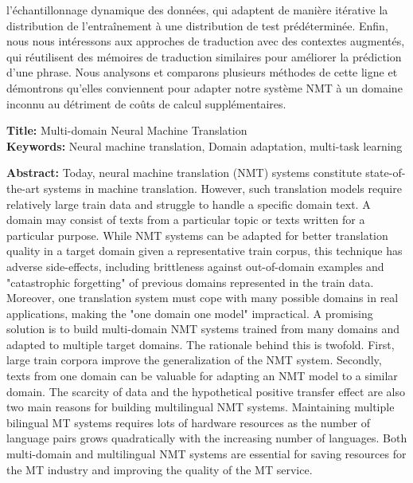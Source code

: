 \begin{mdframed}[linecolor=Prune,linewidth=1,nobreak=false]
\begin{multicols}{2}
l'échantillonnage dynamique des données, qui adaptent de manière itérative la distribution de l'entraînement à une distribution de test prédéterminée. Enfin, nous nous intéressons aux approches de traduction avec des contextes augmentés, qui réutilisent des mémoires de traduction similaires pour améliorer la prédiction d'une phrase. Nous analysons et comparons plusieurs méthodes de cette ligne et démontrons qu'elles conviennent pour adapter notre système NMT à un domaine inconnu au détriment de coûts de calcul supplémentaires.
\end{multicols}
\end{mdframed}

\vspace{8mm}

\begin{mdframed}[linecolor=Prune,linewidth=1]
\footnotesize	
\onehalfspacing
\textbf{Title:} Multi-domain Neural Machine Translation\\
\noindent \textbf{Keywords:} Neural machine translation, Domain adaptation, multi-task learning
\begin{multicols}{2}
\noindent \textbf{Abstract:} Today, neural machine translation (NMT) systems constitute state-of-the-art systems in machine translation. However, such translation models require relatively large train data and struggle to handle a specific domain text. A domain may consist of texts from a particular topic or texts written for a particular purpose. While NMT systems can be adapted for better translation quality in a target domain given a representative train corpus, this technique has adverse side-effects, including brittleness against out-of-domain examples and "catastrophic forgetting" of previous domains represented in the train data. Moreover, one translation system must cope with many possible domains in real applications, making the "one domain one model" impractical. A promising solution is to build multi-domain NMT systems trained from many domains and adapted to multiple target domains. The rationale behind this is twofold. First, large train corpora improve the generalization of the NMT system. Secondly, texts from one domain can be valuable for adapting an NMT model to a similar domain. The scarcity of data and the hypothetical positive transfer effect are also two main reasons for building multilingual NMT systems. Maintaining multiple bilingual MT systems requires lots of hardware resources as the number of language pairs grows quadratically with the increasing number of languages. Both multi-domain and multilingual NMT systems are essential for saving resources for the MT industry and improving the quality of the MT service.


\end{multicols}
\end{mdframed}
